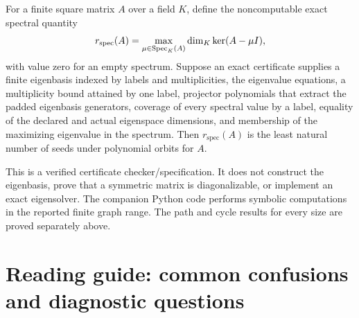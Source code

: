 \begin{construction}
\label{con:exact-graph-seed-rank}
For a finite square matrix $A$ over a field $K$, define the noncomputable exact
spectral quantity
\[
r_{\mathrm{spec}}(A)
=
\max_{\mu\in\operatorname{Spec}_K(A)}
\dim_K\ker(A-\mu I),
\]
with value zero for an empty spectrum.  Suppose an exact certificate supplies
a finite eigenbasis indexed by labels and multiplicities, the eigenvalue
equations, a multiplicity bound attained by one label, projector polynomials
that extract the padded eigenbasis generators, coverage of every spectral
value by a label, equality of the declared and actual eigenspace dimensions,
and membership of the maximizing eigenvalue in the spectrum.  Then
$r_{\mathrm{spec}}(A)$ is the least natural number of seeds under polynomial orbits
for $A$.

This is a verified certificate checker/specification.  It does not construct
the eigenbasis, prove that a symmetric matrix is diagonalizable, or implement
an exact eigensolver.  The companion Python code performs symbolic
computations in the reported finite graph range. The path and cycle
results for every size are proved separately above.
\end{construction}


\section{Reading guide: common confusions and diagnostic questions}

